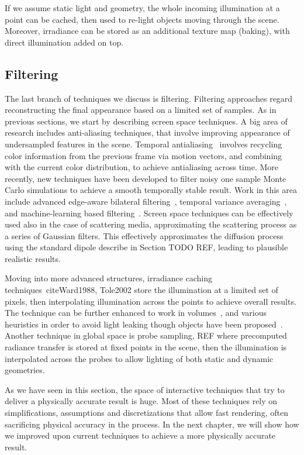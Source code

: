 If we assume static light and geometry, the whole incoming illumination at a point can be cached, then used to re-light objects moving through the scene. Moreover, irradiance can be stored as an additional texture map (baking), with direct illumination added on top. 

\subsection{Filtering}

The last branch of techniques we discuss is filtering. Filtering approaches regard reconstructing the final appearance based on a limited set of samples. As in previous sections, we start by describing screen space techniques. A big area of research includes anti-aliasing techniques, that involve improving appearance of undersampled features in the scene. Temporal antialiasing~\cite{Karis2014,Patney2016} involves recycling color information from the previous frame via motion vectors, and combining with the current color distribution, to achieve antialiasing across time. More recently, new techniques have been developed to filter noisy one sample Monte Carlo simulations to achieve a smooth temporally stable result. Work in this area include advanced edge-aware bilateral filtering~\cite{Mara2017}, temporal variance averaging~\cite{Schied17}, and machine-learning based filtering~\cite{Chaitanya2017}. Screen space techniques can be effectively used also in the case of scattering media, approximating the scattering process as a series of Gaussian filters. This effectively approximates the diffusion process using the standard dipole describe in Section TODO REF, leading to plausible realistic results. 

Moving into more advanced structures, irradiance caching techniques~cite{Ward1988, Tole2002} store the illumination at a limited set of pixels, then interpolating illumination across the points to achieve overall results. The technique can be further enhanced to work in volumes~\cite{Greger1998}, and various heuristics in order to avoid light leaking though objects have been proposed~\cite{Gautron2009}. Another technique in global space is probe sampling, REF where precomputed radiance transfer is stored at fixed points in the scene, then the illumination is interpolated across the probes to allow lighting of both static and dynamic geometries. 

As we have seen in this section, the space of interactive techniques that try to deliver a physically accurate result is huge. Most of these techniques rely on simplifications, assumptions and discretizations that allow fast rendering, often sacrificing physical accuracy in the process. In the next chapter, we will show how we improved upon current techniques to achieve a more physically accurate result.
